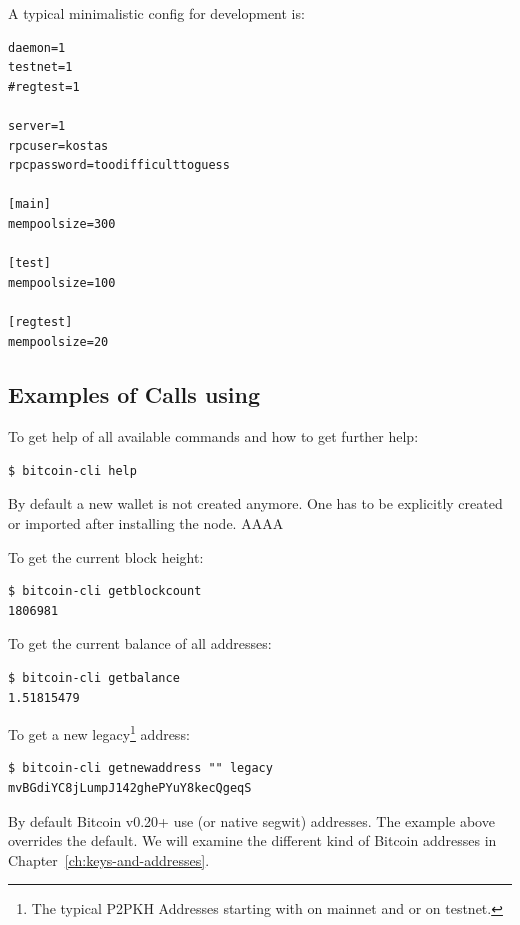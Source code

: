 A typical minimalistic config for development is:
\begin{emphbox}
\begin{lstlisting}[style=Bash]
daemon=1
testnet=1
#regtest=1

server=1
rpcuser=kostas
rpcpassword=toodifficulttoguess

[main]
mempoolsize=300

[test]
mempoolsize=100

[regtest]
mempoolsize=20
\end{lstlisting}
\end{emphbox}


\subsection*{Examples of Calls using }


To get help of all available commands and how to get further help:
\begin{emphbox}
\begin{lstlisting}[style=Bash]
$ bitcoin-cli help
\end{lstlisting}
\end{emphbox}
\vspace{1em}

By default a new wallet is not created anymore. One has to be explicitly created or imported after installing the node.  
AAAA

\noindent To get the current block height:
\begin{emphbox}
\begin{lstlisting}[style=Bash]
$ bitcoin-cli getblockcount
1806981
\end{lstlisting}
\end{emphbox}
\vspace{1em}

\noindent To get the current balance of all addresses:
\begin{emphbox}
\begin{lstlisting}[style=Bash]
$ bitcoin-cli getbalance
1.51815479
\end{lstlisting}
\end{emphbox}
\vspace{1em}

\noindent To get a new legacy\footnote{The typical P2PKH Addresses starting with  on mainnet and  or  on testnet.} address:
\begin{emphbox}
\begin{lstlisting}[style=Bash]
$ bitcoin-cli getnewaddress "" legacy
mvBGdiYC8jLumpJ142ghePYuY8kecQgeqS
\end{lstlisting}
\end{emphbox}
\noindent By default Bitcoin v0.20+ use  (or native segwit) addresses. The example above overrides the default. We will examine the different kind of Bitcoin addresses in Chapter~\ref{ch:keys-and-addresses}.
\vspace{1em}

